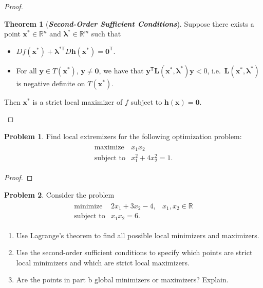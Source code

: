 \documentclass[12pt]{article}
\theoremstyle{definition}
\newtheorem{problem}{Problem}
\newcommand{\vc}[1]{\boldsymbol{#1}}
\newcommand{\tran}{\mathsf{T}}
\newtheorem{theorem}{Theorem}
\begin{document}
\begin{proof}
\begin{enumerate}
\begin{theorem}[\emph{\textbf{Second-Order Sufficient Conditions}}]
        Suppose there exists a point $\vc{x}^* \in \mathbb{R}^n$ and $\vc{\lambda^*} \in \mathbb{R}^m$ such that
        \begin{itemize}
          \item $D f(\vc{x}^*) + \vc{\lambda}^{*\tran} D \vc{h}(\vc{x}^*) = \vc{0}^\tran$.
          \item For all $\vc{y}\in T(\vc{x}^*)$, $\vc{y}\neq \vc{0}$, we have that $\vc{y}^\tran \vc{L}(\vc{x}^*, \vc{\lambda}^{*})\vc{y} < 0$, i.e.\ $\vc{L}(\vc{x}^*, \vc{\lambda}^{*})$ is negative definite on $T(\vc{x}^*)$.
        \end{itemize}
        Then $\vc{x}^*$ is a strict local maximizer of $f$ subject to $\vc{h}(\vc{x}) = \vc{0}.$
      \end{theorem}
  \end{enumerate}
\end{proof}
\newpage


\begin{problem}
  Find local extremizers for the following optimization problem:
  \begin{align*}
    \begin{array}{rl}
      \text{maximize} & x_1x_2 \\
      \text{subject to} & x_1^2 + 4x_2^2 = 1.
    \end{array}
  \end{align*}
\end{problem}

\begin{proof}
\end{proof}
\newpage


\begin{problem}
  Consider the problem
  \begin{align*}
    \begin{array}{rll}
      \text{minimize} & 2x_1 + 3x_2 - 4, & x_1, x_2 \in \mathbb{R} \\
      \text{subject to} & x_1 x_2 = 6.&
    \end{array}
  \end{align*}

  \begin{enumerate}
    \item Use Lagrange's theorem to find all possible local minimizers and maximizers.
    \item Use the second-order sufficient conditions to specify which points are strict
      local minimizers and which are strict local maximizers.
    \item Are the points in part b global minimizers or maximizers? Explain.
  \end{enumerate}
\end{problem}
\end{document}
